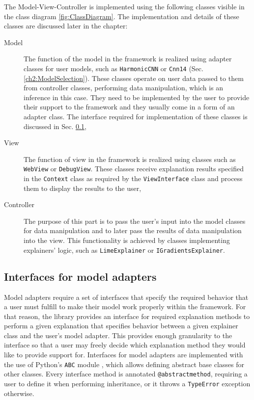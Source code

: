 \documentclass[
    bindingoffset=5mm,  %
    footnoteindent=3mm, %
    hyphenation=true    %
]{src/wut-thesis}
\begin{document}
    The Model-View-Controller is implemented using
    the following classes visible in the class diagram \ref{fig:ClassDiagram}. The implementation and details of these classes are discussed later in the chapter:
    \begin{description}
        \item[Model] The function of the model in the framework is realized using adapter classes for user
        models, such as \texttt{HarmonicCNN} or \texttt{Cnn14} (Sec. \ref{ch2:ModelSelection}). These classes
        operate on user data passed to them from controller classes, performing data manipulation, which is an
        inference in this case. They need to be implemented by the user to provide their support to the framework and they usually come in a form of an adapter class.
        The interface required for implementation of these classes is discussed     
        in Sec. \ref{ch5:AdapterInterfaces},

        \item[View] The function of view in the framework is realized using classes such as \texttt{WebView}
        or \texttt{DebugView}. These classes receive explanation results specified in the \texttt{Context}
        class as required by the \texttt{ViewInterface} class and process them to display the results
        to the user,

        \item[Controller] The purpose of this part is to pass the user’s input into the model
        classes for data manipulation and to later pass the results of data manipulation into 
        the view. This functionality is achieved by classes implementing explainers' logic, 
        such as \texttt{LimeExplainer} or \texttt{IGradientsExplainer}.
    \end{description}

\subsection{Interfaces for model adapters} \label{ch5:AdapterInterfaces}

    Model adapters require a set of interfaces that specify the required behavior that a user
    must fulfill to make their model work properly within the framework. For that reason, the 
    library provides an interface for required explanation methods to perform a given 
    explanation that specifies behavior
    between a given explainer class and the user’s model adapter. This provides enough 
    granularity to the interface so that a user may freely decide which explanation method 
    they would like to provide support for.
    Interfaces for model adapters are implemented with the use of
    Python’s \texttt{ABC} module \cite{pythonABC}, which allows defining abstract 
    base classes for other classes. Every interface method is annotated 
    \texttt{@abstractmethod}, requiring a user to define it when performing inheritance, or it throws a \texttt{TypeError} exception otherwise.
    
\end{document}
